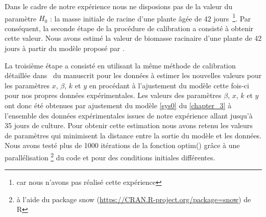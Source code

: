 	Dans le cadre de notre expérience nous ne disposions pas de la valeur du paramètre $ H_0 $ : la masse initiale de racine d'une plante âgée de 42 jours~\footnote{car nous n'avons pas réalisé cette expérience}.   Par conséquent, la seconde étape de la procédure de calibration a consisté à obtenir cette valeur. 
Nous avons estimé la valeur de biomasse racinaire d'une plante de 42 jours à partir du modèle proposé par \citep{Leskovar1990}.
	
	\iffalse
	\begin{equation}
	H_0^{42}= H_0 + \mu t  \quad \text{pour } t = 42,  H_0=H_0x,
	\label{eq:H0}
	\end{equation}
\noindent dans laquelle $H_0$ est la  biomasse racinaire initiale d'une plante à $t=30$ jours  et $\mu$ la croissance racinaire en milligrammes par jour . 
	\fi
	 
	
	La troisième  étape a consisté en utilisant la même méthode de calibration  détaillée dans~ du manuscrit pour les données \citet{Ehwaeti1998} à estimer les nouvelles valeurs pour les paramètres $x$, $\beta$, $k$ et $y$  en procédant à l'ajustement du modèle  cette fois-ci  pour  nos propres données expérimentales. 
Les valeurs des paramètres $\beta$, $x$, $k$ et $y$ ont donc été obtenues par ajustement du modèle 
\eqref{sys0} du \autoref{chapter_3} à l'ensemble des données expérimentales issues de notre expérience allant jusqu'à 35 jours de culture.  Pour obtenir cette estimation nous avons retenu  les valeurs de paramètres qui minimisent la distance entre la sortie du modèle et les données.  Nous avons testé plus de 1000 itérations de la fonction optim() grâce à une parallélisation \footnote{à l'aide du package snow (\href{https://CRAN.R-project.org/package=snow}{https://CRAN.R-project.org/package=snow}) de R} du code et pour des conditions initiales différentes.
	
	
